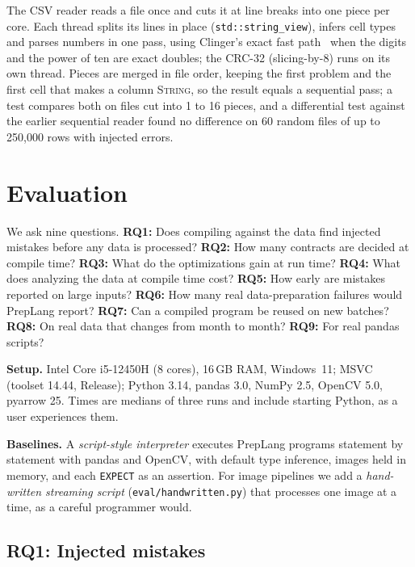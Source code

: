 \documentclass[conference]{IEEEtran}
\begin{document}
The CSV reader reads a file once and cuts it at line breaks into one piece per core. Each thread
splits its lines in place (\texttt{std::string\_view}), infers cell types and parses numbers in one
pass, using Clinger's exact fast path~\cite{clinger1990} when the digits and the power of ten are
exact doubles; the CRC-32 (slicing-by-8) runs on its own thread. Pieces are merged in file order,
keeping the first problem and the first cell that makes a column \textsc{String}, so the result
equals a sequential pass; a test compares both on files cut into 1 to 16 pieces, and a
differential test against the earlier sequential reader found no difference on 60 random files of
up to 250,000 rows with injected errors.

\section{Evaluation}\label{sec:eval}

We ask nine questions. \textbf{RQ1:} Does compiling against the data find injected mistakes before
any data is processed? \textbf{RQ2:} How many contracts are decided at compile time?
\textbf{RQ3:} What do the optimizations gain at run time? \textbf{RQ4:} What does analyzing the
data at compile time cost? \textbf{RQ5:} How early are mistakes reported on large inputs?
\textbf{RQ6:} How many real data-preparation failures would PrepLang report?
\textbf{RQ7:} Can a compiled program be reused on new batches? \textbf{RQ8:} On real data that
changes from month to month? \textbf{RQ9:} For real pandas scripts?

\textbf{Setup.} Intel Core i5-12450H (8 cores), 16\,GB RAM, Windows~11; MSVC (toolset 14.44,
Release); Python 3.14, pandas 3.0, NumPy 2.5, OpenCV 5.0, pyarrow 25. Times are medians of three
runs and include starting Python, as a user experiences them.

\textbf{Baselines.} A \emph{script-style interpreter} executes PrepLang programs statement by
statement with pandas and OpenCV, with default type inference, images held in memory, and each
\texttt{EXPECT} as an assertion. For image pipelines we add a \emph{hand-written streaming script}
(\texttt{eval/handwritten.py}) that processes one image at a time, as a careful programmer would.

\subsection{RQ1: Injected mistakes}
\end{document}
